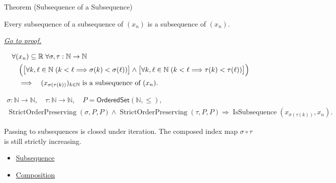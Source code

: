 \begin{theorembox}{Theorem (Subsequence of a Subsequence)}
\begin{theorem}
\label{thm:subsequence-of-subsequence}
Every subsequence of a subsequence of $(x_n)$ is a subsequence of $(x_n)$.

\smallskip
\noindent
\hyperref[prf:subsequence-of-subsequence]{\textit{Go to proof.}}
\end{theorem}
\end{theorembox}

\begin{remark*}
\[
\begin{aligned}
&\forall (x_n)\subseteq\mathbb{R}\;\forall \sigma,\tau:\mathbb{N}\to\mathbb{N}\\
&\quad\Bigl(
  \bigl[\forall k,\ell\in\mathbb{N}\;(k<\ell\Longrightarrow\sigma(k)<\sigma(\ell))\bigr]
  \land
  \bigl[\forall k,\ell\in\mathbb{N}\;(k<\ell\Longrightarrow\tau(k)<\tau(\ell))\bigr]
\Bigr)\\
&\quad\Longrightarrow\quad
(x_{\sigma(\tau(k))})_{k\in\mathbb{N}}\text{ is a subsequence of }(x_n).
\end{aligned}
\]
\end{remark*}

\begin{remark*}
\[
\begin{gathered}
\sigma\colon\mathbb{N}\to\mathbb{N},\quad
\tau\colon\mathbb{N}\to\mathbb{N},\quad
P=\mathsf{OrderedSet}(\mathbb{N},\leq),\\
\operatorname{StrictOrderPreserving}(\sigma,P,P)
\land
\operatorname{StrictOrderPreserving}(\tau,P,P)
\Longrightarrow
\operatorname{IsSubsequence}(x_{\sigma(\tau(k))},x_n).
\end{gathered}
\]
\end{remark*}

\begin{remark*}[Interpretation]
Passing to subsequences is closed under iteration. The composed index map
$\sigma\circ\tau$ is still strictly increasing.
\end{remark*}

\begin{dependencies}
\begin{itemize}
  \item \hyperref[def:subsequence-of-sequence]{Subsequence}
  \item \hyperref[def:composition]{Composition}
\end{itemize}
\end{dependencies}

